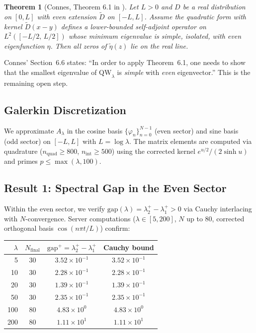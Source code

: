 \documentclass[12pt,a4paper]{article}
\newtheorem{theorem}{Theorem}[section]
\theoremstyle{definition}
\theoremstyle{remark}
\begin{document}
\begin{theorem}[Connes, Theorem 6.1 in \cite{Connes2026}]
Let $L > 0$ and $D$ be a real distribution on $[0,L]$ with even extension $\tilde{D}$ on $[-L,L]$. Assume the quadratic form with kernel $\tilde{D}(x-y)$ defines a lower-bounded self-adjoint operator on $L^2([-L/2,\,L/2])$ whose minimum eigenvalue is simple, isolated, with even eigenfunction $\eta$. Then all zeros of $\tilde{\eta}(z)$ lie on the real line.
\end{theorem}

\noindent Connes' Section~6.6 states: ``In order to apply Theorem~6.1, one needs to show that the smallest eigenvalue of $\mathrm{QW}_\lambda$ is \emph{simple} with \emph{even} eigenvector.'' This is the remaining open step.

\subsection{Galerkin Discretization}

We approximate $A_\lambda$ in the cosine basis $\{\varphi_n\}_{n=0}^{N-1}$ (even sector) and sine basis (odd sector) on $[-L,L]$ with $L = \log\lambda$. The matrix elements are computed via quadrature ($n_{\mathrm{quad}} \geq 800$, $n_{\mathrm{int}} \geq 500$) using the corrected kernel $e^{u/2}/(2\sinh u)$ and primes $p \leq \max(\lambda, 100)$.

\subsection{Result 1: Spectral Gap in the Even Sector}

Within the even sector, we verify $\mathrm{gap}(\lambda) = \lambda_2^+ - \lambda_1^+ > 0$ via Cauchy interlacing with $N$-convergence. Server computations ($\lambda \in [5,200]$, $N$ up to 80, corrected orthogonal basis $\cos(n\pi t/L)$) confirm:

\medskip
\begin{center}
\renewcommand{\arraystretch}{1.2}
\begin{tabular}{r|c|c|c}
$\lambda$ & $N_{\mathrm{final}}$ & $\mathrm{gap}^+ = \lambda_2^+ - \lambda_1^+$ & Cauchy bound \\\hline
5 & 30 & $3.52\times 10^{-1}$ & $3.52\times 10^{-1}$ \\
10 & 30 & $2.28\times 10^{-1}$ & $2.28\times 10^{-1}$ \\
20 & 30 & $1.39\times 10^{-1}$ & $1.39\times 10^{-1}$ \\
50 & 30 & $2.35\times 10^{-1}$ & $2.35\times 10^{-1}$ \\
100 & 80 & $4.83\times 10^{0}$ & $4.83\times 10^{0}$ \\
200 & 80 & $1.11\times 10^{1}$ & $1.11\times 10^{1}$ \\
\end{tabular}
\end{center}
\end{document}
